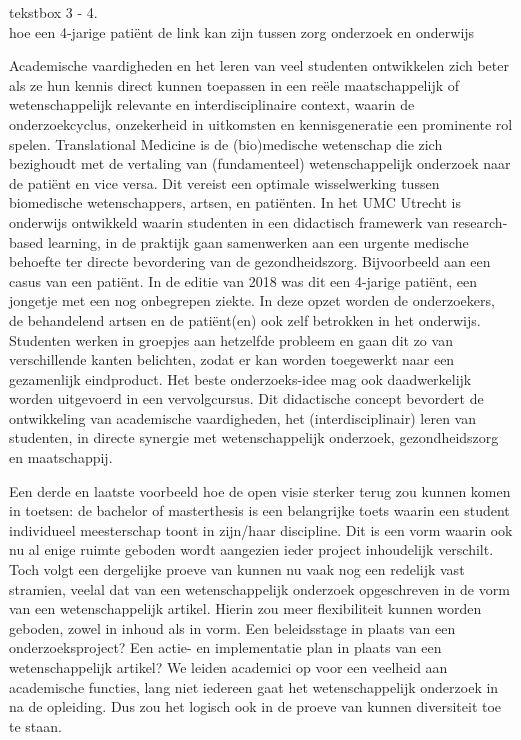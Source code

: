 \documentclass[smallauthor, chapterhaspagenum, nochapterinheader, pagenuminheader,  bigchapnum,medium2, tocpages, garamond, titleinheader]{jote-book}
\begin{document}
	\begin{bookbox}{\raggedright tekstbox 3 - 4. \\hoe een 4-jarige patiënt de link kan zijn tussen zorg onderzoek en onderwijs}
		Academische vaardigheden en het leren van veel studenten ontwikkelen zich beter als ze hun kennis direct kunnen toepassen in een reële maatschappelijk of wetenschappelijk relevante en interdisciplinaire context, waarin de onderzoekcyclus, onzekerheid in uitkomsten en kennisgeneratie een prominente rol spelen. Translational Medicine is de (bio)medische wetenschap die zich bezighoudt met de vertaling van (fundamenteel) wetenschappelijk onderzoek naar de patiënt en vice versa. Dit vereist een optimale wisselwerking tussen biomedische wetenschappers, artsen, en patiënten. In het UMC Utrecht is onderwijs ontwikkeld waarin studenten in een didactisch framewerk van research-based learning, in de praktijk gaan samenwerken aan een urgente medische behoefte ter directe bevordering van de gezondheidszorg. Bijvoorbeeld aan een casus van een patiënt. In de editie van 2018 was dit een 4-jarige patiënt, een jongetje met een nog onbegrepen ziekte. In deze opzet worden de onderzoekers, de behandelend artsen en de patiënt(en) ook zelf betrokken in het onderwijs. Studenten werken in groepjes aan hetzelfde probleem en gaan dit zo van verschillende kanten belichten, zodat er kan worden toegewerkt naar een gezamenlijk eindproduct. Het beste onderzoeks-idee mag ook daadwerkelijk worden uitgevoerd in een vervolgcursus. Dit didactische concept bevordert de ontwikkeling van academische vaardigheden, het (interdisciplinair) leren van studenten, in directe synergie met wetenschappelijk onderzoek, gezondheidszorg en maatschappij.
	\end{bookbox}

	Een derde en laatste voorbeeld hoe de open visie sterker terug zou kunnen komen in toetsen: de bachelor of masterthesis is een belangrijke toets waarin een student individueel meesterschap toont in zijn/haar discipline. Dit is een vorm waarin ook nu al enige ruimte geboden wordt aangezien ieder project inhoudelijk verschilt. Toch volgt een dergelijke proeve van kunnen nu vaak nog een redelijk vast stramien, veelal dat van een wetenschappelijk onderzoek opgeschreven in de vorm van een wetenschappelijk artikel. Hierin zou meer flexibiliteit kunnen worden geboden, zowel in inhoud als in vorm. Een beleidsstage in plaats van een onderzoeksproject? Een actie- en implementatie plan in plaats van een wetenschappelijk artikel? We leiden academici op voor een veelheid aan academische functies, lang niet iedereen gaat het wetenschappelijk onderzoek in na de opleiding. Dus zou het logisch ook in de proeve van kunnen diversiteit toe te staan.
\end{document}
